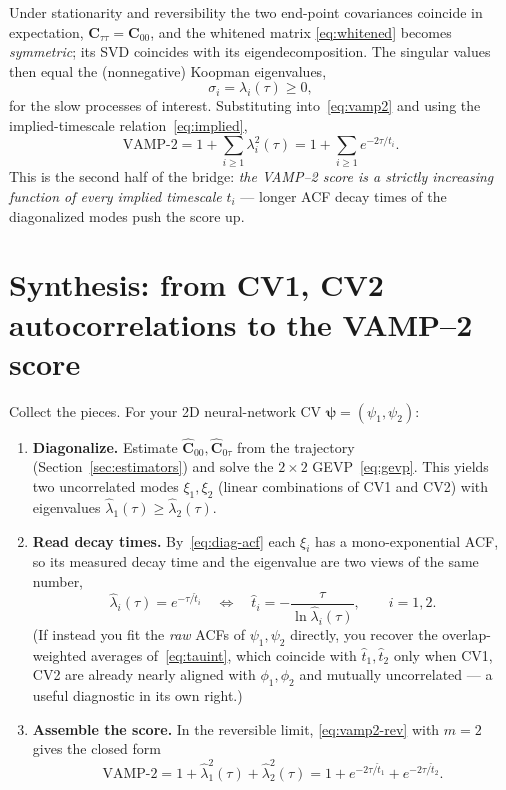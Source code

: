 \documentclass[11pt]{article}
\theoremstyle{plain}
\theoremstyle{definition}
\newcommand{\Cmat}{\mathbf{C}}
\begin{document}
Under stationarity and reversibility the two end-point covariances coincide in
expectation, $\Cmat_{\tau\tau}=\Cmat_{00}$, and the whitened matrix
\eqref{eq:whitened} becomes \emph{symmetric}; its SVD coincides with its
eigendecomposition. The singular values then equal the (nonnegative) Koopman
eigenvalues,
\begin{equation}
\sigma_i=\lambda_i(\tau)\ge0 ,
\end{equation}
for the slow processes of interest. Substituting into~\eqref{eq:vamp2} and using the
implied-timescale relation~\eqref{eq:implied},
\begin{equation}
\boxed{\;
\mathrm{VAMP\text{-}2}
=1+\sum_{i\ge1}\lambda_i^2(\tau)
=1+\sum_{i\ge1}e^{-2\tau/t_i}.
\;}
\label{eq:vamp2-rev}
\end{equation}
This is the second half of the bridge: \emph{the VAMP--2 score is a strictly
increasing function of every implied timescale} $t_i$ --- longer ACF decay times of
the diagonalized modes push the score up.

\section{Synthesis: from CV1, CV2 autocorrelations to the VAMP--2 score}

Collect the pieces. For your 2D neural-network CV $\bm\psi=(\psi_1,\psi_2)$:

\begin{enumerate}[leftmargin=2.2em,itemsep=3pt]
\item \textbf{Diagonalize.} Estimate $\widehat{\Cmat}_{00},\widehat{\Cmat}_{0\tau}$
from the trajectory (Section~\ref{sec:estimators}) and solve the $2\times2$
GEVP~\eqref{eq:gevp}. This yields two uncorrelated modes $\xi_1,\xi_2$ (linear
combinations of CV1 and CV2) with eigenvalues $\hat\lambda_1(\tau)\ge\hat\lambda_2(\tau)$.

\item \textbf{Read decay times.} By~\eqref{eq:diag-acf} each $\xi_i$ has a
mono-exponential ACF, so its measured decay time and the eigenvalue are two views of
the same number,
\begin{equation}
\hat\lambda_i(\tau)=e^{-\tau/\hat t_i}
\quad\Longleftrightarrow\quad
\hat t_i=-\frac{\tau}{\ln\hat\lambda_i(\tau)} ,\qquad i=1,2 .
\end{equation}
(If instead you fit the \emph{raw} ACFs of $\psi_1,\psi_2$ directly, you recover the
overlap-weighted averages of~\eqref{eq:tauint}, which coincide with $\hat t_1,\hat
t_2$ only when CV1, CV2 are already nearly aligned with $\phi_1,\phi_2$ and mutually
uncorrelated --- a useful diagnostic in its own right.)

\item \textbf{Assemble the score.} In the reversible limit,
\eqref{eq:vamp2-rev} with $m=2$ gives the closed form
\begin{equation}
\boxed{\;
\mathrm{VAMP\text{-}2}
=1+\hat\lambda_1^2(\tau)+\hat\lambda_2^2(\tau)
=1+e^{-2\tau/\hat t_1}+e^{-2\tau/\hat t_2}.
\;}
\label{eq:final}
\end{equation}
\end{enumerate}
\end{document}
